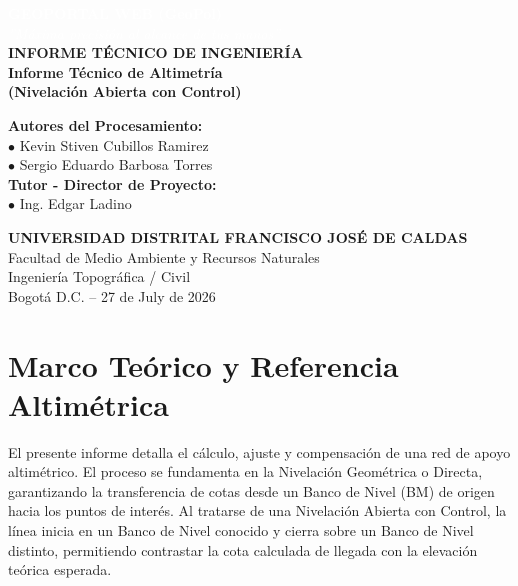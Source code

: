 \documentclass[11pt,letterpaper]{article}
\begin{document}
\begin{titlepage}
\vspace*{-2cm}
\begin{center}
  \textcolor{white}{\Huge \textbf{GEOPORTAL WEB (GeoPol)}} \\[0.5cm]
  \textcolor{white}{\large \textit{''Máxima precisión al alcance de tus manos''}} \\[2cm]
  \vspace{3cm}
  {\LARGE \textbf{INFORME TÉCNICO DE INGENIERÍA}} \\[0.5cm]
  {\Large \textbf{Informe Técnico de Altimetría\\ (Nivelación Abierta con Control)}} \\[2cm]
  \begin{flushleft}
    \Large \textbf{Autores del Procesamiento:}\\[0.2cm]
    \large $\bullet$ Kevin Stiven Cubillos Ramirez \\[0.1cm]
    \large $\bullet$ Sergio Eduardo Barbosa Torres \\[0.1cm]
    \vspace{1cm}
    \Large \textbf{Tutor - Director de Proyecto:}\\[0.2cm]
    \large $\bullet$ Ing. Edgar Ladino
  \end{flushleft}
  \vfill
  \textbf{UNIVERSIDAD DISTRITAL FRANCISCO JOSÉ DE CALDAS}\\[0.2cm]
  Facultad de Medio Ambiente y Recursos Naturales \\ Ingeniería Topográfica / Civil \\[0.2cm]
  Bogotá D.C. -- 27 de July de 2026
\end{center}
\end{titlepage}
\tableofcontents
\newpage
\section{Marco Teórico y Referencia Altimétrica}
El presente informe detalla el cálculo, ajuste y compensación de una red de apoyo altimétrico. El proceso se fundamenta en la Nivelación Geométrica o Directa, garantizando la transferencia de cotas desde un Banco de Nivel (BM) de origen hacia los puntos de interés.
Al tratarse de una Nivelación Abierta con Control, la línea inicia en un Banco de Nivel conocido y cierra sobre un Banco de Nivel distinto, permitiendo contrastar la cota calculada de llegada con la elevación teórica esperada.
\end{document}
